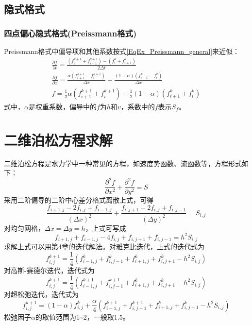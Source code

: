 \subsection{隐式格式}
\subsubsection{四点偏心隐式格式(Preissmann格式)}
Preissmann格式中偏导项和其他系数按式\ref{EqEx_Preissmann_general}来近似：
\begin{equation}
\begin{gathered}
\frac{\partial f}{\partial t}
=
\frac
{(f_{i}^{k+1}+f_{i+1}^{k+1})-(f_{i}^{k}+f_{i+1}^{k})}
{2\Delta t}
\\
\frac{\partial f}{\partial x}
=
\frac
{\alpha(f_{i+1}^{k+1} - f_{i}^{k+1})}
{\Delta x}
+
\frac
{(1-\alpha)(f_{i+1}^{k} - f_{i}^{k})}
{\Delta x}
\\
f
=
\frac{1}{2}\alpha(f_{i+1}^{k+1}+f_{i}^{k+1})
+
\frac{1}{2}(1-\alpha)(f_{i+1}^{k}+f_{i}^{k})
\end{gathered}
\label{EqEx_Preissmann_general}
\end{equation}
式中，$\alpha$是权重系数，偏导中的$f$为$h$和$v$，系数中的$f$表示$S_f$。



\section{二维泊松方程求解}
二维泊松方程是水力学中一种常见的方程，如速度势函数、流函数等，方程形式如下：
\begin{equation}
  \frac{\partial^{2} f}{\partial x^{2}} +
  \frac{\partial^{2} f}{\partial y^{2}}
  =
  S
\end{equation}
采用二阶偏导的二阶中心差分格式离散上式，可得
\begin{equation}
  \frac{f_{i+1,j} - 2f_{i, j} + f_{i-1,j}}{(\Delta x)^{2}} +
  \frac{f_{i,j+1} - 2f_{i, j} + f_{i,j-1}}{(\Delta y)^{2}} 
  =
  S_{i,j}
\end{equation}
对均匀网格，$\Delta x=\Delta y=h$，上式可写成
\begin{equation}
  f_{i+1, j} + f_{i-1,j } - 4f_{i,j} + f_{i, j+1} + f_{i, j-1} = h^{2}S_{i,j}
\end{equation}
求解上式可以用第4章的迭代解法。对雅克比迭代，上式的迭代式为
\begin{equation}
  f_{i, j}^{k+1} = 
\frac{1}{4}(f_{i-1,j }^{k} + f_{i, j-1}^{k} + f_{i+1, j}^{k} + f_{i, j+1}^{k}  - h^{2}S_{i,j})
\end{equation}
对高斯-赛德尔迭代，迭代式为
\begin{equation}
  f_{i, j}^{k+1} = 
\frac{1}{4}(f_{i-1,j }^{k+1} + f_{i, j-1}^{k+1} + f_{i+1, j}^{k} + f_{i, j+1}^{k}  - h^{2}S_{i,j})
\end{equation}
对超松弛迭代，迭代式为
\begin{equation}
  f_{i, j}^{k+1} = 
  (1-\alpha)f_{i, j}^{k}+
  \frac{\alpha}{4}(f_{i-1,j }^{k+1} + f_{i, j-1}^{k+1} + f_{i+1, j}^{k} + f_{i, j+1}^{k}  - h^{2}S_{i,j})
\end{equation}
松弛因子$\alpha$的取值范围为1\textasciitilde 2，一般取1.5。

